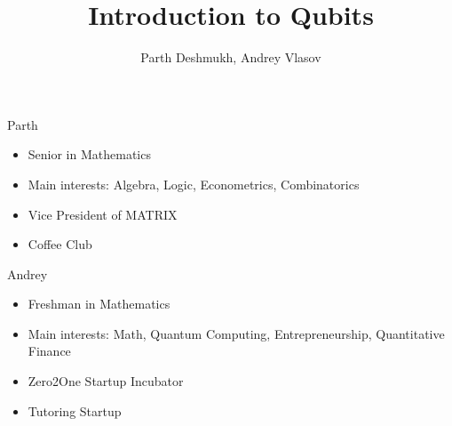 \documentclass[aspectratio=169]{beamer}
\title{Introduction to Qubits}
\author{Parth Deshmukh, Andrey Vlasov}
\date{}
\begin{document}

\begin{frame}
\titlepage
\end{frame}

\begin{frame}{Parth}
    \begin{itemize}
        \item Senior in Mathematics
        \item Main interests: Algebra, Logic, Econometrics, Combinatorics
        \item Vice President of MATRIX
        \item Coffee Club
    \end{itemize}
\end{frame}

\begin{frame}{Andrey}
    \begin{itemize}
        \item Freshman in Mathematics
        \item Main interests: Math, Quantum Computing, Entrepreneurship, Quantitative Finance
        \item Zero2One Startup Incubator
        \item Tutoring Startup
    \end{itemize}
\end{frame}
\end{document}
